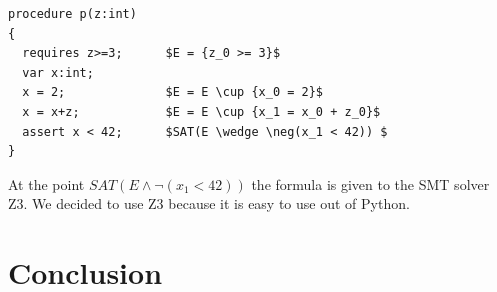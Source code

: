 \documentclass[paper=a4, fontsize=12pt]{scrartcl}
\begin{document}
\begin{lstlisting}[caption=Formula generation, label=lst:ver, mathescape]
procedure p(z:int) 
{ 
  requires z>=3;      $E = {z_0 >= 3}$ 
  var x:int; 
  x = 2;              $E = E \cup {x_0 = 2}$ 
  x = x+z;            $E = E \cup {x_1 = x_0 + z_0}$ 
  assert x < 42;      $SAT(E \wedge \neg(x_1 < 42)) $ 
} 
\end{lstlisting}

At the point $SAT(E \wedge \neg(x_1 < 42))$ the formula is given to the SMT solver Z3. We decided to use Z3 because it is easy to use out of Python.


\section{Conclusion}


 

\end{document}
